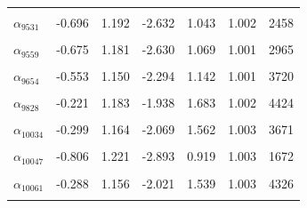 \begin{longtable}{lrrrrrr}
\cellcolor{gray!10}{$\alpha_{9518}$} & \cellcolor{gray!10}{-0.581} & \cellcolor{gray!10}{1.170} & \cellcolor{gray!10}{-2.404} & \cellcolor{gray!10}{1.126} & \cellcolor{gray!10}{1.001} & \cellcolor{gray!10}{3609}\\
$\alpha_{9531}$ & -0.696 & 1.192 & -2.632 & 1.043 & 1.002 & 2458\\
\cellcolor{gray!10}{$\alpha_{9557}$} & \cellcolor{gray!10}{-0.655} & \cellcolor{gray!10}{1.176} & \cellcolor{gray!10}{-2.538} & \cellcolor{gray!10}{1.061} & \cellcolor{gray!10}{1.001} & \cellcolor{gray!10}{2639}\\
$\alpha_{9559}$ & -0.675 & 1.181 & -2.630 & 1.069 & 1.001 & 2965\\
\cellcolor{gray!10}{$\alpha_{9560}$} & \cellcolor{gray!10}{-0.398} & \cellcolor{gray!10}{1.188} & \cellcolor{gray!10}{-2.149} & \cellcolor{gray!10}{1.405} & \cellcolor{gray!10}{1.001} & \cellcolor{gray!10}{4061}\\
$\alpha_{9654}$ & -0.553 & 1.150 & -2.294 & 1.142 & 1.001 & 3720\\
\cellcolor{gray!10}{$\alpha_{9823}$} & \cellcolor{gray!10}{-0.692} & \cellcolor{gray!10}{1.192} & \cellcolor{gray!10}{-2.636} & \cellcolor{gray!10}{1.038} & \cellcolor{gray!10}{1.002} & \cellcolor{gray!10}{2634}\\
$\alpha_{9828}$ & -0.221 & 1.183 & -1.938 & 1.683 & 1.002 & 4424\\
\cellcolor{gray!10}{$\alpha_{10029}$} & \cellcolor{gray!10}{-0.267} & \cellcolor{gray!10}{1.156} & \cellcolor{gray!10}{-1.963} & \cellcolor{gray!10}{1.588} & \cellcolor{gray!10}{1.001} & \cellcolor{gray!10}{3514}\\
$\alpha_{10034}$ & -0.299 & 1.164 & -2.069 & 1.562 & 1.003 & 3671\\
\cellcolor{gray!10}{$\alpha_{10043}$} & \cellcolor{gray!10}{-0.265} & \cellcolor{gray!10}{1.129} & \cellcolor{gray!10}{-1.987} & \cellcolor{gray!10}{1.504} & \cellcolor{gray!10}{1.001} & \cellcolor{gray!10}{3880}\\
$\alpha_{10047}$ & -0.806 & 1.221 & -2.893 & 0.919 & 1.003 & 1672\\
\cellcolor{gray!10}{$\alpha_{10053}$} & \cellcolor{gray!10}{-0.328} & \cellcolor{gray!10}{1.153} & \cellcolor{gray!10}{-2.044} & \cellcolor{gray!10}{1.446} & \cellcolor{gray!10}{1.001} & \cellcolor{gray!10}{4442}\\
$\alpha_{10061}$ & -0.288 & 1.156 & -2.021 & 1.539 & 1.003 & 4326\\
\cellcolor{gray!10}{$\alpha_{10070}$} & \cellcolor{gray!10}{-0.514} & \cellcolor{gray!10}{1.148} & \cellcolor{gray!10}{-2.308} & \cellcolor{gray!10}{1.196} & \cellcolor{gray!10}{1.000} & \cellcolor{gray!10}{4021}\\

\end{longtable}
